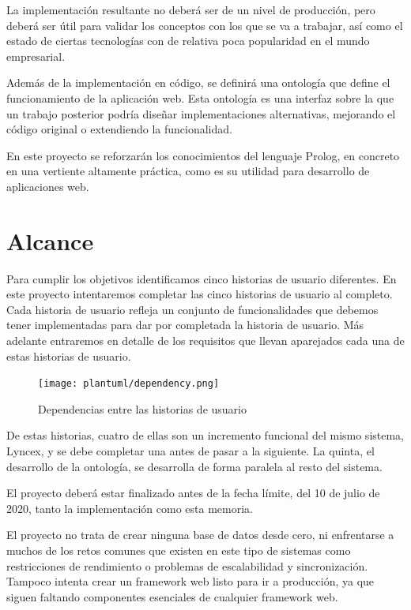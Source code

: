 \documentclass[12pt]{report} %
\begin{document}
La implementación resultante no deberá ser de un nivel de producción, pero deberá ser útil para validar los conceptos con los que se va a trabajar, así como el estado de ciertas tecnologías con de relativa poca popularidad en el mundo empresarial.

Además de la implementación en código, se definirá una ontología que define el funcionamiento de la aplicación web. Esta ontología es una interfaz sobre la que un trabajo posterior podría diseñar implementaciones alternativas, mejorando el código original o extendiendo la funcionalidad.

En este proyecto se reforzarán los conocimientos del lenguaje Prolog, en concreto en una vertiente altamente práctica, como es su utilidad para desarrollo de aplicaciones web.

\section{Alcance}

Para cumplir los objetivos identificamos cinco historias de usuario diferentes. En este proyecto intentaremos completar las cinco historias de usuario al completo. Cada historia de usuario refleja un conjunto de funcionalidades que debemos tener implementadas para dar por completada la historia de usuario. Más adelante entraremos en detalle de los requisitos que llevan aparejados cada una de estas historias de usuario.

\begin{figure}[h]
    \centering
    \texttt{[image: plantuml/dependency.png]}
    \caption{Dependencias entre las historias de usuario}
    \label{fig:dependencia}
\end{figure}

De estas historias, cuatro de ellas son un incremento funcional del mismo sistema, Lyncex, y se debe completar una antes de pasar a la siguiente. La quinta, el desarrollo de la ontología, se desarrolla de forma paralela al resto del sistema.

El proyecto deberá estar finalizado antes de la fecha límite, del 10 de julio de 2020, tanto la implementación como esta memoria.

El proyecto no trata de crear ninguna base de datos desde cero, ni enfrentarse a muchos de los retos comunes que existen en este tipo de sistemas como restricciones de rendimiento o problemas de escalabilidad y sincronización. Tampoco intenta crear un framework web listo para ir a producción, ya que siguen faltando componentes esenciales de cualquier framework web.
\end{document}
